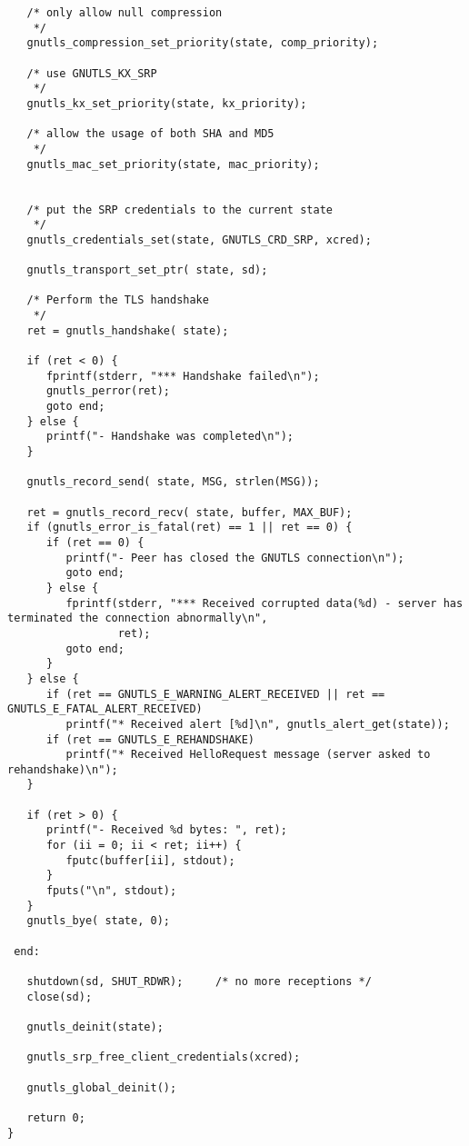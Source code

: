 \begin{verbatim}
   /* only allow null compression
    */
   gnutls_compression_set_priority(state, comp_priority);
 
   /* use GNUTLS_KX_SRP
    */
   gnutls_kx_set_priority(state, kx_priority);
 
   /* allow the usage of both SHA and MD5
    */
   gnutls_mac_set_priority(state, mac_priority);


   /* put the SRP credentials to the current state
    */
   gnutls_credentials_set(state, GNUTLS_CRD_SRP, xcred);

   gnutls_transport_set_ptr( state, sd);

   /* Perform the TLS handshake
    */
   ret = gnutls_handshake( state);

   if (ret < 0) {
      fprintf(stderr, "*** Handshake failed\n");
      gnutls_perror(ret);
      goto end;
   } else {
      printf("- Handshake was completed\n");
   }

   gnutls_record_send( state, MSG, strlen(MSG));

   ret = gnutls_record_recv( state, buffer, MAX_BUF);
   if (gnutls_error_is_fatal(ret) == 1 || ret == 0) {
      if (ret == 0) {
         printf("- Peer has closed the GNUTLS connection\n");
         goto end;
      } else {
         fprintf(stderr, "*** Received corrupted data(%d) - server has terminated the connection abnormally\n",
                 ret);
         goto end;
      }
   } else {
      if (ret == GNUTLS_E_WARNING_ALERT_RECEIVED || ret == GNUTLS_E_FATAL_ALERT_RECEIVED)
         printf("* Received alert [%d]\n", gnutls_alert_get(state));
      if (ret == GNUTLS_E_REHANDSHAKE)
         printf("* Received HelloRequest message (server asked to rehandshake)\n");
   }

   if (ret > 0) {
      printf("- Received %d bytes: ", ret);
      for (ii = 0; ii < ret; ii++) {
         fputc(buffer[ii], stdout);
      }
      fputs("\n", stdout);
   }
   gnutls_bye( state, 0);

 end:

   shutdown(sd, SHUT_RDWR);     /* no more receptions */
   close(sd);

   gnutls_deinit(state);

   gnutls_srp_free_client_credentials(xcred);

   gnutls_global_deinit();

   return 0;
}

\end{verbatim}
